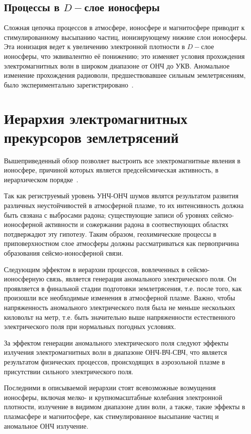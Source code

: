 \documentclass[12pt, oneside, a4paper]{article}
\begin{document}
\subsection{Процессы в $D-$слое ионосферы}
Сложная цепочка процессов в атмосфере, ионосфере и магнитосфере приводит к стимулированному высыпанию частиц, ионизирующему нижние слои ионосферы. Эта ионизация ведет к увеличению электронной плотности в $D-$слое ионосферы, что эквивалентно её понижению; это изменяет условия прохождения электромагнитных волн в широком диапазоне от ОНЧ до УКВ. Аномальное изменение прохождения радиоволн, предшествовавшее сильным землетрясениям, было экспериментально зарегистрировано~\cite{Gufeld:1992}.  
\section{Иерархия электромагнитных прекурсоров землетрясений}
Вышеприведенный  обзор позволяет выстроить все электромагнитные явления в ионосфере, причиной которых является предсейсмическая активность, в иерархическом порядке~\cite{Main:2002}. 

Так как региструемый уровень УНЧ-ОНЧ шумов являтся результатом развития различных неустойчивостей в атмосферной плазме, то их интенсивность должна быть свзяана с выбросами радона; существующие записи об уровнях сейсмо-ионосферной активности и сожержании радона в соотвествующих областях потдвержадют эту гипотезу. Таким образом, геохимические процессы в приповерхностном слое атмосферы должны рассматриваться как первопричина образования сейсмо-ионосферной связи. 

Следующим эффектом в иерархии процессов, вовлеченных в сейсмо-ионосферную связь, является  генерация аномального электрического поля. Он проявляется в финальной стадии подготовки землетрясения, т.е. после того, как произошли все необходимые изменения в атмосферной плазме. Важно, чтобы напряженность аномального электрического поля была не меньше нескольких киловольт на метр, т.е. быть значительно выше напряженности естественного электрического поля при нормальных погодных условиях.

За эффектом генерации аномального электрического поля следуют эффекты излучения электромагнитных волн в диапазоне ОНЧ-ВЧ-СВЧ, что является результатом физических процессов, происходящих в аэрозольной плазме в присутствии сильного электрического поля.

Последними в описываемой иерархии стоят всевозможные возмущения ионосферы, включая мелко- и крупномасштабные колебания электронной плотности, излучение в видимом диапазоне длин волн, а также, такие эффекты в плазмасфере и магнитосфере, как стимулированное высыпание частиц и аномальное ОНЧ излучение.
\end{document}
